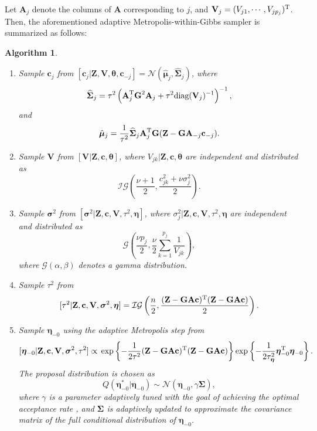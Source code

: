 \documentclass[aoas,preprint]{imsart}
\numberwithin{equation}{section}
\theoremstyle{plain}
\newtheorem{myalg}{Algorithm}[section]
\begin{document}
Let $\textbf{A}_j$ denote the columns of $\textbf{A}$ corresponding to $j$, and $\textbf{V}_j=(V_{j1}, \cdots, V_{jp_j})^{\rm T}$. Then, the aforementioned adaptive Metropolis-within-Gibbs sampler is summarized as follows:
\begin{myalg}
\begin{enumerate}
\item Sample $\textbf{c}_j$ from $[\textbf{c}_j|\textbf{Z}, \textbf{V}, \bm{\theta}, \textbf{c}_{-j}]=\mathcal{N}(\hat{\bm{\mu}}_j, \widehat{\bm{\Sigma}}_j)$,
where 
$$\widehat{\bm{\Sigma}}_j=\tau^2\left(\textbf{A}_j^{\rm T}\textbf{G}^2\textbf{A}_j+\tau^2\mbox{diag} (\textbf{V}_j)^{-1} \right)^{-1},$$
and
$$\hat{\bm{\mu}}_j=\frac{1}{\tau^2} \widehat{\bm{\Sigma}}_j \textbf{A}_j^{\rm T} \textbf{G} (\textbf{Z}-\textbf{G}\textbf{A}_{-j}\textbf{c}_{-j}).$$
\item Sample $\textbf{V}$ from $[\textbf{V}|\textbf{Z}, \textbf{c}, \bm{\theta}]$, where $V_{jk}|\textbf{Z}, \textbf{c}, \bm{\theta}$ are independent and distributed as 
$$\mathcal{IG}\left(\frac{\nu+1}{2}, \frac{c_{jk}^2+\nu \sigma_j^2}{2} \right).$$
\item Sample $\bm{\sigma}^2$ from $[\bm{\sigma}^2|\textbf{Z}, \textbf{c}, \textbf{V}, \tau^2, \bm{\eta}]$, where $\sigma_j^2|\textbf{Z}, \textbf{c}, \textbf{V}, \tau^2, \bm{\eta}$
are independent and distributed as 
$$\mathcal{G}\left( \frac{\nu p_j}{2}, \frac{\nu}{2} \sum \limits_{k=1}^{p_j} \frac{1}{V_{jk}} \right),$$
where $\mathcal{G}(\alpha, \beta)$ denotes a gamma distribution.
\item Sample $\tau^2$ from 
$$[\tau^2|\textbf{Z}, \textbf{c}, \textbf{V}, \bm{\sigma}^2, \bm{\eta}]=\mathcal{IG}\left( \frac{n}{2}, \frac{(\textbf{Z}-\textbf{G}\textbf{A}\textbf{c})^{\rm T}(\textbf{Z}-\textbf{G}\textbf{A}\textbf{c})}{2} \right).$$
\item Sample $\bm{\eta}_{-0}$ using the adaptive Metropolis step from
$$[\bm{\eta}_{-0}|\textbf{Z}, \textbf{c}, \textbf{V}, \bm{\sigma}^2, \tau^2]\propto \\ \exp\left\{ -\frac{1}{2\tau^2}(\textbf{Z}-\textbf{G}\textbf{A}\textbf{c})^{\rm T}(\textbf{Z}-\textbf{G}\textbf{A}\textbf{c}) \right\}\exp \left\{ -\frac{1}{2\tau^2_{\bm{\eta}}}\bm{\eta}_{-0}^{\rm T}\bm{\eta}_{-0} \right\}.$$
The proposal distribution is chosen as
$$Q(\bm{\eta}_{-0}^*|\bm{\eta}_{-0}) \sim \mathcal{N}(\bm{\eta}_{-0}, \gamma \bm{\Sigma}),$$
where $\gamma$ is a parameter adaptively tuned with the goal of achieving the optimal acceptance rate \citep{Gelman-96}, and $\bm{\Sigma}$ is adaptively updated to approximate the covariance matrix of the full conditional distribution of $\bm{\eta}_{-0}$.
\end{enumerate}
\end{myalg}
\end{document}
